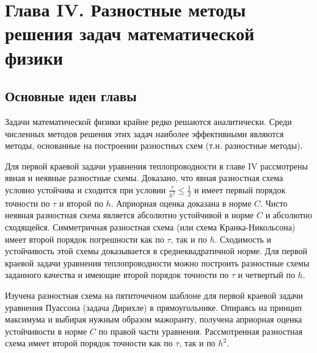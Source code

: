 \newpage
{}
\pagestyle{empty}
\vspace{0.5cm}

\section*{Глава IV. Разностные методы решения задач математической физики}

\subsection{Основные идеи главы}

Задачи математической физики крайне редко решаются аналитически. Среди численных методов решения этих задач наиболее эффективными являются методы, основанные на построении разностных схем (т.н. разностные методы).

Для первой краевой задачи уравнения теплопроводности в главе IV рассмотрены явная и неявные разностные схемы. Доказано, что явная разностная схема условно устойчива и сходится при условии \begin{math} \frac{\tau}{h^2} \leq \frac{1}{2} \end{math} и имеет первый порядок точности по $\tau$ и второй по $h$. Априорная оценка доказана в норме $C$. Чисто неявная разностная схема является абсолютно устойчивой в норме $C$ и абсолютно сходящейся. Симметричная разностная схема (или схема Кранка-Никольсона) имеет второй порядок погрешности как по $\tau$, так и по $h$. Сходимость и устойчивость этой схемы доказывается в среднеквадратичной норме. Для первой краевой задачи уравнения теплопроводности можно построить разностные схемы заданного качества и имеющие второй порядок точности по $\tau$ и четвертый по $h$.

Изучена разностная схема на пятиточечном шаблоне для первой краевой задачи уравнения Пуассона (задача Дирихле) в прямоугольнике. Опираясь на принцип максимума и выбирая нужным образом мажоранту, получена априорная оценка устойчивости в норме $C$ по правой части уравнения. Рассмотренная разностная схема имеет второй порядок точности как по $\tau$, так и по \begin{math} h^2 \end{math}.

